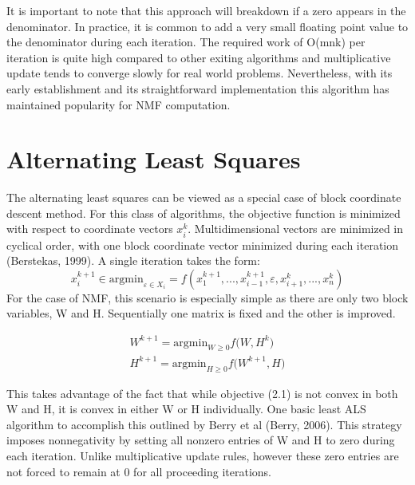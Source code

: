 \documentclass[final,leqno,onefignum,onetabnum]{siamltex1213}
\begin{document}
It is important to note that this approach will breakdown if a zero appears in the denominator. In practice, it is common to add a very small floating point value to the denominator during each iteration. The required work of O(mnk) per iteration is quite high compared to other exiting algorithms and multiplicative update tends to converge slowly for real world problems. Nevertheless, with its early establishment and its straightforward implementation this algorithm has maintained popularity for NMF computation. 

\section{Alternating Least Squares} The alternating least squares can be viewed as a special case of block coordinate descent method. For this class of algorithms, the objective function is minimized with respect to coordinate vectors $x^{k}_{i}$. Multidimensional vectors are minimized in cyclical order, with one block coordinate vector minimized during each iteration (Berstekas, 1999). A single iteration takes the form:
\begin{equation}\label{bcv1}
 x^{k+1}_{i} \in {\mathrm{argmin}_{\varepsilon \in X_i}} = f( x^{k+1}_{1}, ..., x^{k+1}_{i-1}, \varepsilon, x^{k}_{i+1}, ..., x^{k}_{n})
\end{equation}
For the case of NMF, this scenario is especially simple as there are only two block variables, W and H. Sequentially one matrix is fixed and the other is improved. 

\begin{equation}\label{bcv2}
\begin{align} 
W^{k+1} = {\mathrm{argmin}_{W \ge 0} f(W,H^k}) \\
H^{k+1} = {\mathrm{argmin}_{H \ge 0} f(W^{k+1},H})
\end{align}
\end{equation}




This takes advantage of the fact that while objective (2.1) is not convex in both W and H, it is convex in either W or H individually. One basic least ALS algorithm to accomplish this outlined by Berry et al (Berry, 2006). This strategy imposes nonnegativity by setting all nonzero entries of W and H to zero during each iteration. Unlike multiplicative update rules, however these zero entries are not forced to remain at 0 for all proceeding iterations. \\
\end{document}
